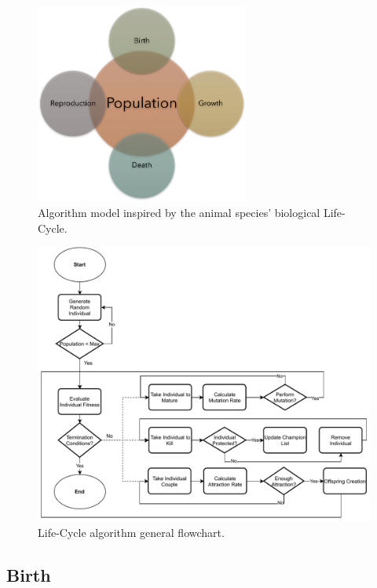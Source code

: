 \documentclass[graybox]{svmult}
\begin{document}
\begin{figure}
    \centering
    \includegraphics[width=70mm]{img/fig2_proposal.pdf}
    \caption{Algorithm model inspired by the animal species' biological Life-Cycle.} \label{fig.proposal}
    \end{figure}

\begin{figure}
    \includegraphics[width=\textwidth]{img/fig4_flowchart.pdf}
    \caption{Life-Cycle algorithm general flowchart.} \label{fig.flowchart}
    \end{figure}
    

\subsection{Birth}
\end{document}
